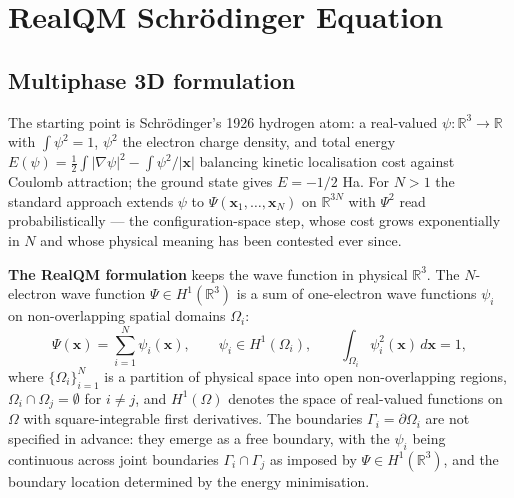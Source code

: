 \documentclass[11pt]{article}
\begin{document}
\section{RealQM Schr\"odinger Equation}\label{sec:reformulation}

\subsection{Multiphase 3D formulation}

The starting point is Schr\"odinger's 1926 hydrogen atom: a real-valued $\psi : \mathbb{R}^3 \to \mathbb{R}$ with $\int \psi^2 = 1$, $\psi^2$ the electron charge density, and total energy $E(\psi) = \tfrac{1}{2}\int |\nabla\psi|^2 - \int \psi^2/|\mathbf{x}|$ balancing kinetic localisation cost against Coulomb attraction; the ground state gives $E = -1/2$ Ha. For $N>1$ the standard approach extends $\psi$ to $\Psi(\mathbf{x}_1, \ldots, \mathbf{x}_N)$ on $\mathbb{R}^{3N}$ with $\Psi^2$ read probabilistically --- the configuration-space step, whose cost grows exponentially in $N$ and whose physical meaning has been contested ever since.

\textbf{The RealQM formulation} keeps the wave function in physical $\mathbb{R}^3$. The $N$-electron wave function $\Psi \in H^1(\mathbb{R}^3)$ is a sum of one-electron wave functions $\psi_i$ on non-overlapping spatial domains $\Omega_i$:
\begin{equation}\label{eq:Psi-sum}
\Psi(\mathbf{x}) = \sum_{i=1}^{N} \psi_i(\mathbf{x}),
\qquad
\psi_i \in H^1(\Omega_i), \qquad \int_{\Omega_i} \psi_i^2(\mathbf{x})\, d\mathbf{x} = 1,
\end{equation}
where $\{\Omega_i\}_{i=1}^{N}$ is a partition of physical space into open non-overlapping regions, $\Omega_i \cap \Omega_j = \emptyset$ for $i \ne j$, and $H^1(\Omega)$ denotes the space of real-valued functions on $\Omega$ with square-integrable first derivatives. The boundaries $\Gamma_i = \partial \Omega_i$ are not specified in advance: they emerge as a free boundary, with the $\psi_i$ being continuous across joint boundaries $\Gamma_i \cap \Gamma_j$ as imposed by $\Psi \in H^1(\mathbb{R}^3)$, and the boundary location determined by the energy minimisation.
\end{document}
